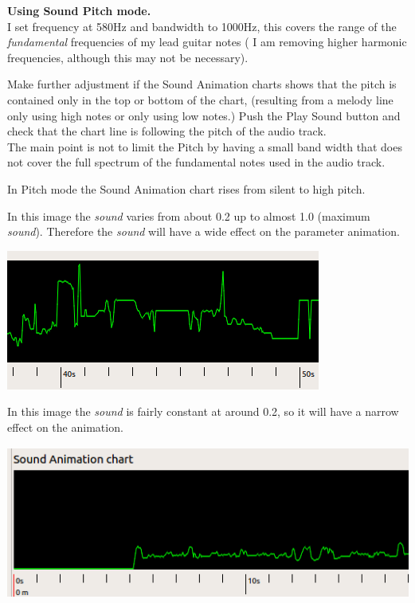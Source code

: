 \textbf{Using Sound Pitch mode.}\\[2\baselineskip]I set frequency at
580Hz and bandwidth to 1000Hz, this covers the range of the
\emph{fundamental} frequencies of my lead guitar notes ( I am removing
higher harmonic frequencies, although this may not be necessary).

Make further adjustment if the Sound Animation charts shows that the
pitch is contained only in the top or bottom of the chart, (resulting
from a melody line only using high notes or only using low notes.) Push
the Play Sound button and check that the chart line is following the
pitch of the audio track.\\[2\baselineskip]The main point is not to
limit the Pitch by having a small band width that does not cover the
full spectrum of the fundamental notes used in the audio track.

In Pitch mode the Sound Animation chart rises from silent to high pitch.

In this image the \emph{sound} varies from about 0.2 up to almost 1.0
(maximum \emph{sound}). Therefore the \emph{sound} will have a wide
effect on the parameter animation.

\includegraphics[width=4.07283in,height=1.81260in]{img/sound/media/image5.png}

In this image the \emph{sound} is fairly constant at around 0.2, so it
will have a narrow effect on the animation.

\includegraphics[width=5.40630in,height=1.98976in]{img/sound/media/image6.png}


